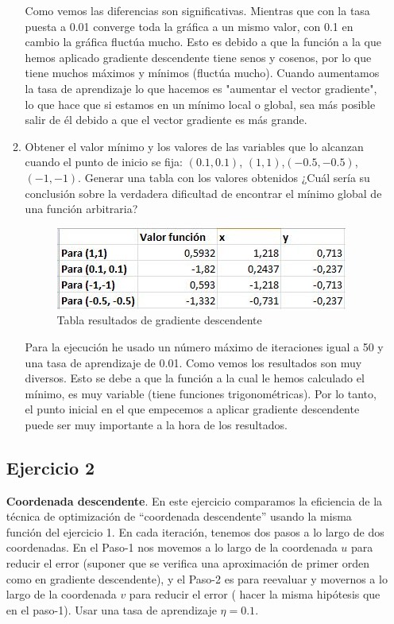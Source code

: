 \begin{enumerate}
\begin{enumerate}
			Como vemos las diferencias son significativas. Mientras que con la tasa puesta a 0.01 converge toda la gráfica a un mismo valor, con 0.1 en cambio la gráfica fluctúa mucho. Esto es debido a que la función a la que hemos aplicado gradiente descendente tiene senos y cosenos, por lo que tiene muchos máximos y mínimos (fluctúa mucho). Cuando aumentamos la tasa de aprendizaje lo que hacemos es "aumentar el vector gradiente", lo que hace que si estamos en un mínimo local o global, sea más posible salir de él debido a que el vector gradiente es más grande.

				\item Obtener el valor mínimo y los valores de las variables que lo alcanzan cuando el punto de inicio se fija: $(0.1,0.1)$, $(1,1)$,$(-0.5,-0.5)$,$(-1,-1)$. Generar una tabla con los valores obtenidos ¿Cuál sería su conclusión sobre la verdadera dificultad de encontrar el mínimo global de una función arbitraria?
				
				\begin{figure} [H]
				\centering
				\includegraphics[width=0.7\linewidth]{Captura4}
				\caption{Tabla resultados de gradiente descendente}
				\label{fig:Captura4}
				\end{figure}
				
				Para la ejecución he usado un número máximo de iteraciones igual a 50 y una tasa de aprendizaje de 0.01. Como vemos los resultados son muy diversos. Esto se debe a que la función a la cual le hemos calculado el mínimo, es muy variable (tiene funciones trigonométricas). Por lo tanto, el punto inicial en el que empecemos a aplicar gradiente descendente puede ser muy importante a la hora de los resultados.

			\end{enumerate}
			
			\subsection{Ejercicio 2}
			 \textbf{Coordenada descendente}. En este ejercicio comparamos la eficiencia de la técnica de optimización de ``coordenada descendente'' usando la misma función del ejercicio 1. En cada iteración, tenemos dos pasos a lo largo de dos coordenadas. En el Paso-1 nos movemos a lo largo de la coordenada $u$ para reducir el error (suponer que se verifica una aproximación de primer orden como en gradiente descendente), y  el Paso-2 es para reevaluar y movernos a lo largo de la coordenada $v$ para reducir el error ( hacer la misma hipótesis que en el paso-1). Usar una tasa de aprendizaje $\eta=0.1$.
			 

\end{enumerate}
